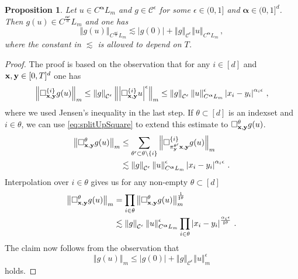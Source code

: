 \documentclass[12pt]{article}
\numberwithin{equation}{section}
\theoremstyle{plain}
\newtheorem{proposition}[theorem]{Proposition}
\theoremstyle{definition}
\newcommand{\abs}[1]{\left\vert #1 \right\vert}
\newcommand{\norm}[1]{\left\Vert #1\right\Vert}
\def\fy{\mathbf y}\def\fz{\mathbf z}
\def\falpha{{\boldsymbol\alpha}}
\begin{document}
\begin{proposition}\label{prop:g(u)CanBeReconstructed}
    Let $u\in C^\falpha L_m$ and $g\in \mathcal{C}^\epsilon$ for some $\epsilon\in(0,1]$ and $\falpha\in (0,1]^d$. Then $g(u)\in C^{\frac{\falpha\epsilon}d}L_m$ and one has 
    \begin{equation*}
        \norm{g(u)}_{C^{\frac{\falpha\epsilon}d}L_m}\lesssim \abs{g(0)}+\norm{g}_{\mathcal{C}^\epsilon}\norm{u}_{C^\falpha L_m}\,,
    \end{equation*}
    where the constant in $\lesssim$ is allowed to depend on $T$.
\end{proposition}
\begin{proof}
The proof is based on the observation that for any $i \in [d]$  and  $\fx,\fy\in[0,T]^d$ one has 
    \begin{equation*}
        \norm{\square^{\{i\}}_{\fx,\fy} g(u)}_m \le \norm{g}_{\mathcal{C}^\epsilon}\norm{\abs{\square^{\{i\}}_{\fx,\fy} u}^\epsilon}_m \le \norm{g}_{\mathcal{C}^\epsilon}\norm{u}^\epsilon_{C^\falpha L_m}\abs{x_i-y_i}^{\alpha_i\epsilon}\,,
\end{equation*}
    where we used Jensen's inequality in the last step. If $\theta\subset[d]$ is an indexset and $i\in\theta$, we can use \eqref{eq:splitUpSquare} to extend this estimate to $\square^\theta_{\fx,\fy} g(u)$.
    \begin{align*}
        \norm{\square^\theta_{\fx,\fy} g(u)}_m &\le \sum_{\theta'\subset\theta\setminus\{i\}} \norm{\square^{\{i\}}_{\pi^{\theta'}_\fy \fx,\fy} g(u)}_m\\
        &\lesssim \norm{g}_{\mathcal{C}^\epsilon}\norm{u}^\epsilon_{C^\falpha L_m}\abs{x_i-y_i}^{\alpha_i\epsilon}\,.
    \end{align*}
Interpolation over $i\in\theta$ gives us for any non-empty $\theta\subset[d]$
    \begin{align*}
        \norm{\square^\theta_{\fx,\fy}g(u)}_m &=\prod_{i\in\theta} \norm{\square^\theta_{\fx,\fy}g(u)}_m^{\frac1{\sharp\theta}}\\
        &\lesssim \norm{g}_{\mathcal{C}^\epsilon}\norm{u}^\epsilon_{C^\falpha L_m}\prod_{i\in\theta}\abs{x_i-y_i}^{\frac{\alpha_i\epsilon}{\sharp\theta}}\,.
    \end{align*}
    The claim now follows from the observation that
    \begin{equation*}
        \norm{g(u)}_m \le \abs{g(0)}+\norm{g}_{\mathcal{C}^\epsilon}\norm{u}_{m}^{\epsilon}
    \end{equation*}
    holds.
\end{proof}
\end{document}
